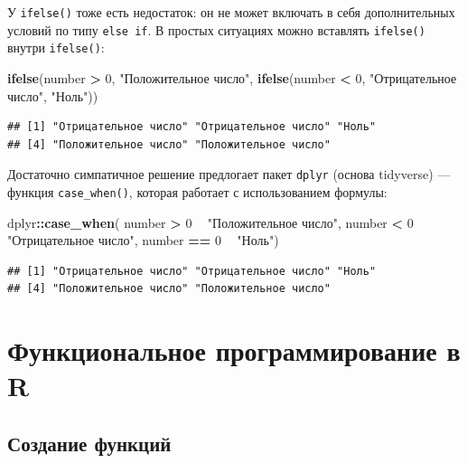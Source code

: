 \documentclass[
]{book}
\newenvironment{Shaded}{\begin{snugshade}}{\end{snugshade}}
\newcommand{\DecValTok}[1]{\textcolor[rgb]{0.00,0.00,0.81}{#1}}
\newcommand{\KeywordTok}[1]{\textcolor[rgb]{0.13,0.29,0.53}{\textbf{#1}}}
\newcommand{\NormalTok}[1]{#1}
\newcommand{\OperatorTok}[1]{\textcolor[rgb]{0.81,0.36,0.00}{\textbf{#1}}}
\newcommand{\StringTok}[1]{\textcolor[rgb]{0.31,0.60,0.02}{#1}}
\begin{document}
У \texttt{ifelse()} тоже есть недостаток: он не может включать в себя дополнительных условий по типу \texttt{else\ if}. В простых ситуациях можно вставлять \texttt{ifelse()} внутри \texttt{ifelse()}:

\begin{Shaded}
\begin{Highlighting}[]
\KeywordTok{ifelse}\NormalTok{(number }\OperatorTok{>}\StringTok{ }\DecValTok{0}\NormalTok{,}
       \StringTok{"Положительное число"}\NormalTok{,}
       \KeywordTok{ifelse}\NormalTok{(number }\OperatorTok{<}\StringTok{ }\DecValTok{0}\NormalTok{, }\StringTok{"Отрицательное число"}\NormalTok{, }\StringTok{"Ноль"}\NormalTok{))}
\end{Highlighting}
\end{Shaded}

\begin{verbatim}
## [1] "Отрицательное число" "Отрицательное число" "Ноль"               
## [4] "Положительное число" "Положительное число"
\end{verbatim}

Достаточно симпатичное решение предлогает пакет \texttt{dplyr} (основа tidyverse) --- функция \texttt{case\_when()}, которая работает с использованием формулы:

\begin{Shaded}
\begin{Highlighting}[]
\NormalTok{dplyr}\OperatorTok{::}\KeywordTok{case_when}\NormalTok{(}
\NormalTok{  number }\OperatorTok{>}\StringTok{ }\DecValTok{0} \OperatorTok{~}\StringTok{ "Положительное число"}\NormalTok{,}
\NormalTok{  number }\OperatorTok{<}\StringTok{ }\DecValTok{0} \OperatorTok{~}\StringTok{ "Отрицательное число"}\NormalTok{,}
\NormalTok{  number }\OperatorTok{==}\StringTok{ }\DecValTok{0} \OperatorTok{~}\StringTok{ "Ноль"}\NormalTok{)}
\end{Highlighting}
\end{Shaded}

\begin{verbatim}
## [1] "Отрицательное число" "Отрицательное число" "Ноль"               
## [4] "Положительное число" "Положительное число"
\end{verbatim}

\hypertarget{functional}{%
\chapter{Функциональное программирование в R}\label{functional}}

\hypertarget{create_fun}{%
\section{Создание функций}\label{create_fun}}
\end{document}
